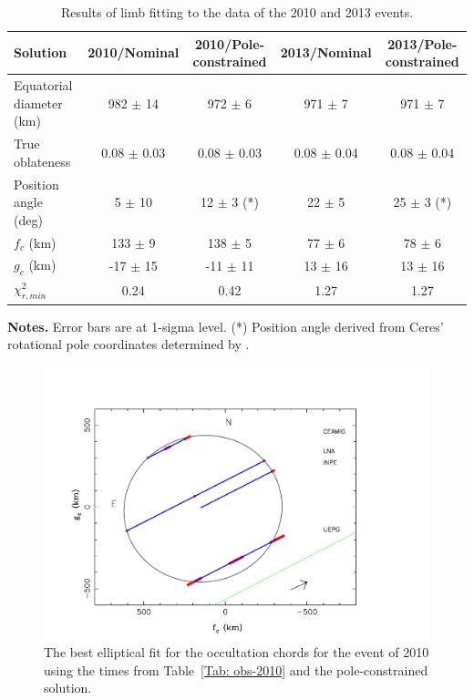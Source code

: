 \documentclass[useAMS,usenatbib]{mn2e}
\begin{document}
\begin{table}
 \centering
 \begin{minipage}{140mm}
  \caption{Results of limb fitting to the data of the 2010 and 2013 events.}
  \begin{tabular}{@{}lcccc}
  \hline
     Solution & 2010/Nominal & 2010/Pole-constrained & 2013/Nominal & 2013/Pole-constrained \\
\hline
Equatorial diameter (km) & 982 $\pm$ 14 & 972 $\pm$ 6  & 971 $\pm$ 7  & 971 $\pm$ 7\\
True oblateness        & 0.08 $\pm$ 0.03 & 0.08 $\pm$ 0.03 & 0.08 $\pm$ 0.04 & 0.08 $\pm$ 0.04\\
Position angle (deg)   & 5 $\pm$ 10    & 12 $\pm$ 3 (*)& 22 $\pm$ 5    & 25 $\pm$ 3 (*)\\
$f_c$ (km)             & 133 $\pm$ 9   & 138 $\pm$ 5   & 77 $\pm$ 6    & 78 $\pm$ 6\\
$g_c$ (km)             & -17 $\pm$ 15  & -11 $\pm$ 11  & 13 $\pm$ 16   & 13 $\pm$ 16\\
$\chi^2_{r,min}$       & 0.24          &  0.42         & 1.27          & 1.27\\
\hline
\end{tabular}
\textbf{Notes.} Error bars are at 1-sigma level.
(*) Position angle derived from Ceres' rotational pole coordinates determined by \cite{Drummond2014}.
\end{minipage}
\end{table}

\begin{figure}
\includegraphics[scale=0.36]{figures/Ceres_2010_body.pdf} 
\caption{The best elliptical fit for the occultation chords for the event of 2010 using the times from Table~\ref{Tab: obs-2010} and the pole-constrained solution. \label{Fig:Ceres-2010-body}}
\end{figure}
\end{document}
